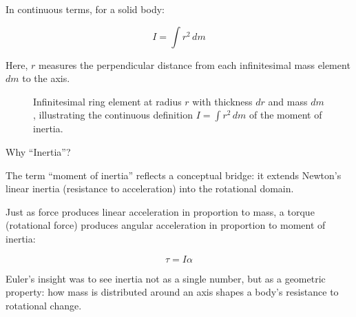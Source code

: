 In continuous terms, for a solid body:

\[
I = \int r^2 \, dm
\]

Here, \( r \) measures the perpendicular distance from each infinitesimal mass element \( dm \) to the axis.

\begin{figure}[H]
    \centering
    \caption{Infinitesimal ring element at radius \(r\) with thickness \(dr\) and mass \(dm\), illustrating the continuous definition \(I = \int r^2\,dm\) of the moment of inertia.}
    \label{fig:moment-of-inertia-continuous}
\end{figure}


\begin{HistoricalSidebar}{Why “Inertia”?}

The term “moment of inertia” reflects a conceptual bridge: it extends Newton’s linear inertia 
(resistance to acceleration) into the rotational domain.

Just as force produces linear acceleration in proportion to mass, a torque (rotational force) 
produces angular acceleration in proportion to moment of inertia:

\[
\tau = I \alpha
\]

Euler’s insight was to see inertia not as a single number, but as a geometric property: how mass is 
distributed around an axis shapes a body’s resistance to rotational change.

\end{HistoricalSidebar}

